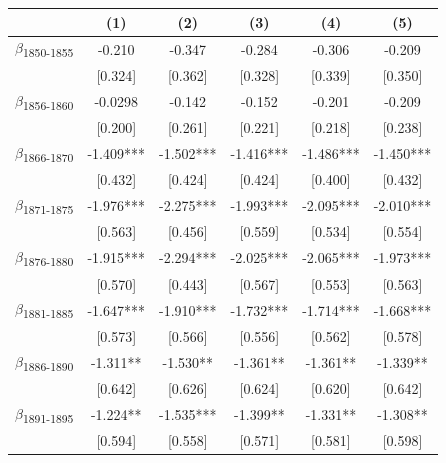 {
\def\sym#1{\ifmmode^{#1}\else\(^{#1}\)\fi}
\begin{tabular}{l*{5}{c}}
\toprule
            &\multicolumn{1}{c}{(1)}   &\multicolumn{1}{c}{(2)}   &\multicolumn{1}{c}{(3)}   &\multicolumn{1}{c}{(4)}   &\multicolumn{1}{c}{(5)}   \\
\midrule
$\beta$\textsubscript{1850-1855}&      -0.210   &      -0.347   &      -0.284   &      -0.306   &      -0.209   \\
            &     [0.324]   &     [0.362]   &     [0.328]   &     [0.339]   &     [0.350]   \\
$\beta$\textsubscript{1856-1860}&     -0.0298   &      -0.142   &      -0.152   &      -0.201   &      -0.209   \\
            &     [0.200]   &     [0.261]   &     [0.221]   &     [0.218]   &     [0.238]   \\
$\beta$\textsubscript{1866-1870}&      -1.409***&      -1.502***&      -1.416***&      -1.486***&      -1.450***\\
            &     [0.432]   &     [0.424]   &     [0.424]   &     [0.400]   &     [0.432]   \\
$\beta$\textsubscript{1871-1875}&      -1.976***&      -2.275***&      -1.993***&      -2.095***&      -2.010***\\
            &     [0.563]   &     [0.456]   &     [0.559]   &     [0.534]   &     [0.554]   \\
$\beta$\textsubscript{1876-1880}&      -1.915***&      -2.294***&      -2.025***&      -2.065***&      -1.973***\\
            &     [0.570]   &     [0.443]   &     [0.567]   &     [0.553]   &     [0.563]   \\
$\beta$\textsubscript{1881-1885}&      -1.647***&      -1.910***&      -1.732***&      -1.714***&      -1.668***\\
            &     [0.573]   &     [0.566]   &     [0.556]   &     [0.562]   &     [0.578]   \\
$\beta$\textsubscript{1886-1890}&      -1.311** &      -1.530** &      -1.361** &      -1.361** &      -1.339** \\
            &     [0.642]   &     [0.626]   &     [0.624]   &     [0.620]   &     [0.642]   \\
$\beta$\textsubscript{1891-1895}&      -1.224** &      -1.535***&      -1.399** &      -1.331** &      -1.308** \\
            &     [0.594]   &     [0.558]   &     [0.571]   &     [0.581]   &     [0.598]   \\

\end{tabular}}
